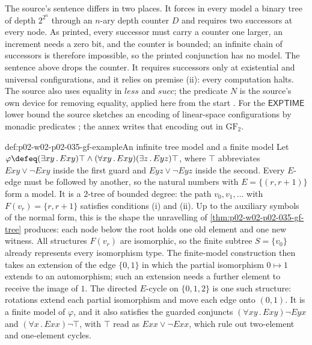 The source's sentence differs in two places.  It forces in every model a
binary tree of depth \(2^{2^{n}}\) through an \(n\)-ary depth counter \(D\)
and requires two successors at every node.  As printed, every successor
must carry a counter one larger, an increment needs a zero bit, and the
counter is bounded; an infinite chain of successors is therefore impossible,
so the printed conjunction has no model.  The sentence above
drops the counter.  It requires successors only at existential and universal
configurations, and it relies on premise (ii): every computation halts.  The
source also uses equality in \(\mathit{less}\) and \(\mathit{succ}\); the
predicate \(N\) is the source's own device for removing equality, applied
here from the start \cite[proof of thm.~4.4 and cor.~4.5]{Gradel1999}.  For the
\(\mathsf{EXPTIME}\) lower bound the source sketches an encoding of
linear-space configurations by monadic predicates
\cite[cor.~4.6]{Gradel1999}; the annex writes that encoding out in
\(\mathrm{GF}_2\).

\begin{hbexample}{def:p02-w02-p02-035-gf-example}{An infinite tree model and a finite model}
Let \(\varphi\defeq(\exists xy\,.\,Exy)\top\land(\forall xy\,.\,Exy)(\exists z\,.\,Eyz)\top\),
where \(\top\) abbreviates \(Exy\lor\neg Exy\) inside the first guard and
\(Eyz\lor\neg Eyz\) inside the second.  Every \(E\)-edge must be followed by
another, so the natural numbers with \(E=\{(r,r+1)\}\) form a model.  It is a
\(2\)-tree of bounded degree: the path \(v_0,v_1,\ldots\) with
\(F(v_r)=\{r,r+1\}\) satisfies conditions (i) and (ii).  Up to the auxiliary symbols of the normal form, this is the shape the
unravelling of \cref{thm:p02-w02-p02-035-gf-tree} produces: each node below
the root holds one old element and one new witness.  All structures
\(F(v_r)\) are isomorphic, so the finite subtree \(S=\{v_0\}\) already
represents every isomorphism type.  The finite-model construction then takes
an extension of the edge \(\{0,1\}\) in which the partial isomorphism
\(0\mapsto1\) extends to an automorphism; such an extension needs a further
element to receive the image of \(1\).  The directed \(E\)-cycle on
\(\{0,1,2\}\) is one such structure: rotations extend each partial
isomorphism and move each edge onto \((0,1)\).  It is a finite model of
\(\varphi\), and it also satisfies the guarded conjuncts
\((\forall xy\,.\,Exy)\neg Eyx\) and \((\forall x\,.\,Exx)\neg\top\), with \(\top\) read as \(Exx\lor\neg Exx\), which rule out
two-element and one-element cycles.
\end{hbexample}

